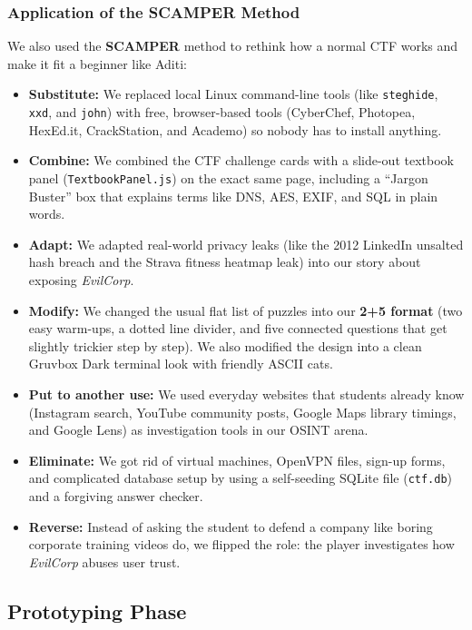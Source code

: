 \documentclass[11pt,a4paper]{article}
\begin{document}
\subsubsection{Application of the SCAMPER Method}
We also used the \textbf{SCAMPER} method to rethink how a normal CTF works and make it fit a beginner like Aditi:
\begin{itemize}
    \item \textbf{Substitute:} We replaced local Linux command-line tools (like \texttt{steghide}, \texttt{xxd}, and \texttt{john}) with free, browser-based tools (CyberChef, Photopea, HexEd.it, CrackStation, and Academo) so nobody has to install anything.
    \item \textbf{Combine:} We combined the CTF challenge cards with a slide-out textbook panel (\texttt{TextbookPanel.js}) on the exact same page, including a ``Jargon Buster'' box that explains terms like DNS, AES, EXIF, and SQL in plain words.
    \item \textbf{Adapt:} We adapted real-world privacy leaks (like the 2012 LinkedIn unsalted hash breach and the Strava fitness heatmap leak) into our story about exposing \textit{EvilCorp}.
    \item \textbf{Modify:} We changed the usual flat list of puzzles into our \textbf{2+5 format} (two easy warm-ups, a dotted line divider, and five connected questions that get slightly trickier step by step). We also modified the design into a clean Gruvbox Dark terminal look with friendly ASCII cats.
    \item \textbf{Put to another use:} We used everyday websites that students already know (Instagram search, YouTube community posts, Google Maps library timings, and Google Lens) as investigation tools in our OSINT arena.
    \item \textbf{Eliminate:} We got rid of virtual machines, OpenVPN files, sign-up forms, and complicated database setup by using a self-seeding SQLite file (\texttt{ctf.db}) and a forgiving answer checker.
    \item \textbf{Reverse:} Instead of asking the student to defend a company like boring corporate training videos do, we flipped the role: the player investigates how \textit{EvilCorp} abuses user trust.
\end{itemize}

\clearpage
\subsection{Prototyping Phase}
\end{document}
